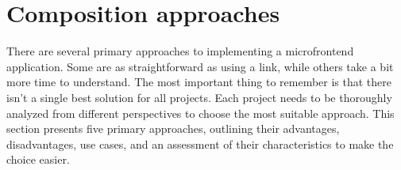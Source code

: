 \section{Composition approaches}
There are several primary approaches to implementing a microfrontend application. Some are as straightforward as using a link, while others take a bit more time to understand. The most important thing to remember is that there isn’t a single best solution for all projects. Each project needs to be thoroughly analyzed from different perspectives to choose the most suitable approach. This section presents five primary approaches, outlining their advantages, disadvantages, use cases, and an assessment of their characteristics to make the choice easier. 





